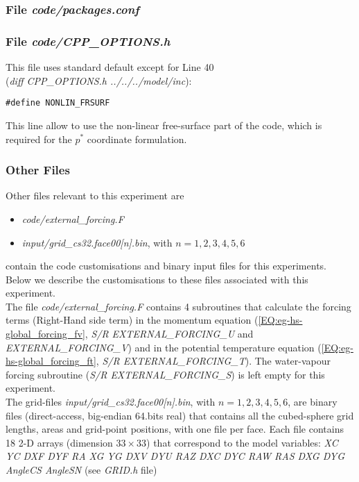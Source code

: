 %

\subsubsection{File {\it code/packages.conf}}
\label{www:tutorials}



\begin{small}

\end{small}

\subsubsection{File {\it code/CPP\_OPTIONS.h}}
\label{www:tutorials}

This file uses standard default except for Line 40\\
({\it diff CPP\_OPTIONS.h ../../../model/inc}):
\begin{verbatim}
#define NONLIN_FRSURF 
\end{verbatim}
This line allow to use the non-linear free-surface part of the code,
which is required for the $p^*$ coordinate formulation.

\subsubsection{Other Files }
\label{www:tutorials}

Other files relevant to this experiment are
\begin{itemize}
\item {\it code/external\_forcing.F}
\item {\it input/grid\_cs32.face00[n].bin}, with $n=1,2,3,4,5,6$
\end{itemize}
contain the code customisations and binary input files for this 
experiments. Below we describe the customisations
to these files associated with this experiment.\\

The file {\it code/external\_forcing.F} contains 4 subroutines
that calculate the forcing terms (Right-Hand side term) in the
momentum equation (\ref{EQ:eg-hs-global_forcing_fv}, 
{\it S/R EXTERNAL\_FORCING\_U} and {\it EXTERNAL\_FORCING\_V})
and in the potential temperature equation 
(\ref{EQ:eg-hs-global_forcing_ft}, {\it S/R  EXTERNAL\_FORCING\_T}). 
The water-vapour forcing subroutine ({\it S/R EXTERNAL\_FORCING\_S})
is left empty for this experiment.\\

The grid-files {\it input/grid\_cs32.face00[n].bin}, with $n=1,2,3,4,5,6$,
are binary files (direct-access, big-endian 64.bits real) that 
contains all the cubed-sphere grid lengths, areas and grid-point
positions, with one file per face.
Each file contains 18 2-D arrays (dimension $33 \times 33$) that correspond
to the model variables:
{\it 
XC YC DXF DYF RA XG YG DXV DYU RAZ DXC DYC RAW RAS DXG DYG AngleCS AngleSN 
}
(see {\it GRID.h} file)

